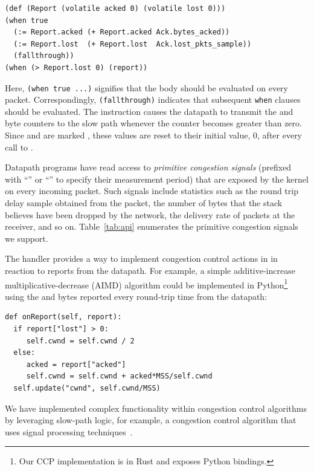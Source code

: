 {\footnotesize
\begin{verbatim}
(def (Report (volatile acked 0) (volatile lost 0)))
(when true
  (:= Report.acked (+ Report.acked Ack.bytes_acked))
  (:= Report.lost  (+ Report.lost  Ack.lost_pkts_sample))
  (fallthrough))
(when (> Report.lost 0) (report))
\end{verbatim}
}

Here, \texttt{(when true ...)} signifies that the body should be evaluated on every packet.
Correspondingly, \texttt{(fallthrough)} indicates that subsequent \texttt{when} clauses should be evaluated.
The  instruction causes the datapath to
transmit the  and  byte counters to the slow path whenever
the  counter becomes greater than zero.
Since  and  are marked , these values are reset to their initial value, 0, 
after every call to .

Datapath programs have read access to {\em primitive congestion signals} 
(prefixed with ``'' or ``'' to specify their measurement period) that are
exposed by the kernel on every incoming packet.
Such signals include statistics such as the round trip delay sample obtained
from the packet, the number of bytes that the stack believes have been dropped
by the network, the delivery rate of packets at the receiver, and so on.
Table~\ref{tab:api} enumerates the primitive congestion signals we support.

 The  handler provides a way to
implement congestion control actions in \userspace in reaction to reports from the datapath.
For example, a simple additive-increase
multiplicative-decrease (AIMD) algorithm could be implemented in Python\footnote{Our CCP implementation is in Rust and exposes Python bindings.} using
the  and  bytes reported every round-trip time from the datapath:

{\footnotesize
\begin{verbatim}
def onReport(self, report):
  if report["lost"] > 0:
     self.cwnd = self.cwnd / 2
  else:
     acked = report["acked"]
     self.cwnd = self.cwnd + acked*MSS/self.cwnd
  self.update("cwnd", self.cwnd/MSS)
\end{verbatim}
}

We have implemented complex functionality within congestion control algorithms
by leveraging slow-path logic, for example, a congestion control
algorithm that uses signal processing techniques~\cite{nimbus}.

